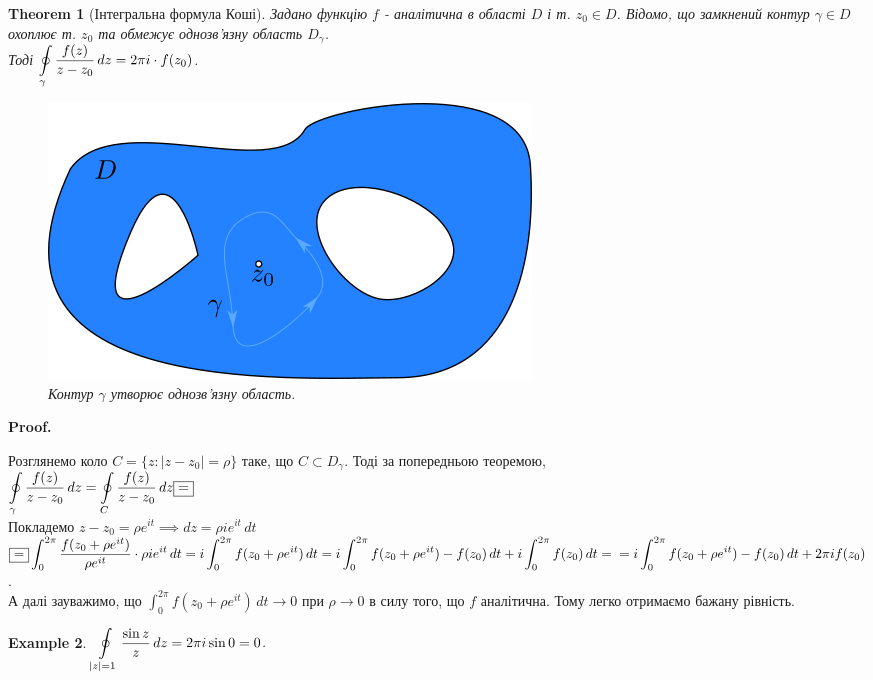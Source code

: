 \documentclass[a4paper, 10pt]{article}
\makeatletter
\def\qed{$\blacksquare$}
\theoremstyle{theoremdd}
\newtheorem{theorem}{Theorem}[subsection]
\theoremstyle{theoremdd}
\theoremstyle{theoremdd}
\theoremstyle{theoremdd}
\newtheorem{example}[theorem]{Example}
\theoremstyle{theoremdd}
\theoremstyle{theoremdd}
\theoremstyle{theoremdd}
\theoremstyle{theoremdd}
\renewenvironment{proof}[1][Proof.\\]{\par
\pushQED{\hfill \qed}%
\normalfont \topsep6\p@\@plus6\p@\relax
\trivlist
\item\relax
{\bfseries
#1\@addpunct{.}}\hspace\labelsep\ignorespaces
}{%
\popQED\endtrivlist\@endpefalse
}
\makeatother
\begin{document}
\begin{theorem}[Інтегральна формула Коші]
Задано функцію $f$ - аналітична в області $D$ і т. $z_0 \in D$. Відомо, що замкнений контур $\gamma \in D$ охоплює т. $z_0$ та обмежує однозв'язну область $D_{\gamma}$. \\
Тоді $\displaystyle\oint\displaylimits_{\gamma} \frac{f(z)}{z-z_0}\,dz = 2 \pi i \cdot f(z_0)$.
	\begin{figure}[h]
	\centerline{\includegraphics[scale = 1]{path1376.png}}
	\caption{Контур $\gamma$ утворює однозв'язну область.}
	\end{figure}
\end{theorem}
	
\begin{proof}
Розглянемо коло $C = \{ z: |z-z_0|=\rho\}$ таке, що $C \subset D_{\gamma}$. Тоді за попередньою теоремою,\\
	$\displaystyle\oint\displaylimits_{\gamma} \frac{f(z)}{z-z_0}\,dz = \oint\displaylimits_C \frac{f(z)}{z-z_0}\,dz \boxed{=}$\\
	Покладемо $z-z_0=\rho e^{it} \implies dz=\rho ie^{it}\,dt$\\
	$\displaystyle \boxed{=} \int_{0}^{2\pi} \frac{f(z_0+\rho e^{it})}{\rho e^{it}} \cdot \rho i e^{it} \,dt = i \int_{0}^{2\pi} f(z_0+ \rho e^{it})\,dt = i \int_0^{2\pi} f(z_0+ \rho e^{it}) - f(z_0)\,dt + i \int_0^{2\pi} f(z_0)\,dt = \\
	= i \int_0^{2\pi} f(z_0+ \rho e^{it}) - f(z_0)\,dt + 2\pi i f(z_0)$.\\
	А далі зауважимо, що $\displaystyle\int_0^{2\pi} f(z_0+\rho e^{it})\,dt \to 0$ при $\rho \to 0$ в силу того, що $f$ аналітична. Тому легко отримаємо бажану рівність.
\end{proof}

\begin{example}
$\displaystyle\oint\displaylimits_{|z|=1} \frac{\sin z}{z} \,dz = 2\pi i \sin 0 = 0$.
\end{example}
\end{document}
